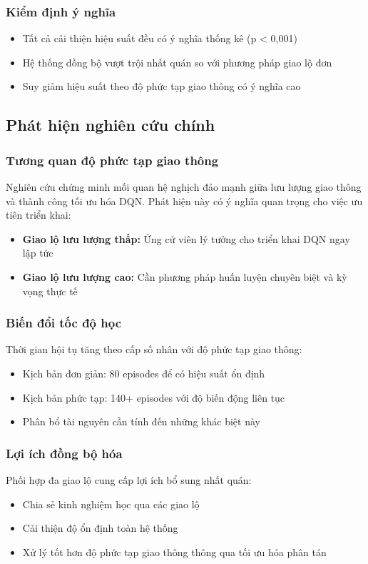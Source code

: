 \subsubsection{Kiểm định ý nghĩa}
\begin{itemize}
    \item Tất cả cải thiện hiệu suất đều có ý nghĩa thống kê (p < 0,001)
    \item Hệ thống đồng bộ vượt trội nhất quán so với phương pháp giao lộ đơn
    \item Suy giảm hiệu suất theo độ phức tạp giao thông có ý nghĩa cao
\end{itemize}

\subsection{Phát hiện nghiên cứu chính}

\subsubsection{Tương quan độ phức tạp giao thông}
Nghiên cứu chứng minh mối quan hệ nghịch đảo mạnh giữa lưu lượng giao thông và
thành công tối ưu hóa DQN. Phát hiện này có ý nghĩa quan trọng cho việc ưu tiên triển khai:
\begin{itemize}
    \item \textbf{Giao lộ lưu lượng thấp:} Ứng cử viên lý tưởng cho triển khai DQN ngay lập tức
    \item \textbf{Giao lộ lưu lượng cao:} Cần phương pháp huấn luyện chuyên biệt và kỳ vọng thực tế
\end{itemize}

\subsubsection{Biến đổi tốc độ học}
Thời gian hội tụ tăng theo cấp số nhân với độ phức tạp giao thông:
\begin{itemize}
    \item Kịch bản đơn giản: 80 episodes để có hiệu suất ổn định
    \item Kịch bản phức tạp: 140+ episodes với độ biến động liên tục
    \item Phân bổ tài nguyên cần tính đến những khác biệt này
\end{itemize}

\subsubsection{Lợi ích đồng bộ hóa}
Phối hợp đa giao lộ cung cấp lợi ích bổ sung nhất quán:
\begin{itemize}
    \item Chia sẻ kinh nghiệm học qua các giao lộ
    \item Cải thiện độ ổn định toàn hệ thống
    \item Xử lý tốt hơn độ phức tạp giao thông thông qua tối ưu hóa phân tán
\end{itemize}

